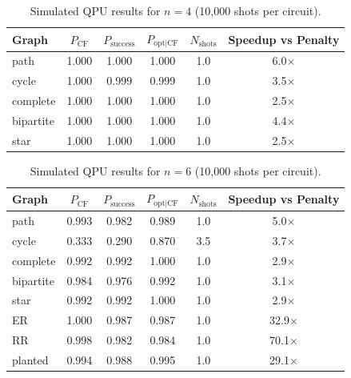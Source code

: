 \begin{table}[ht]
\centering
\caption{Simulated QPU results for $n=4$ (10,000 shots per circuit).}
\label{tab:qpu_n4}
\begin{tabular}{lccccc}
\toprule
Graph & $P_{\mathrm{CF}}$ & $P_{\mathrm{success}}$ & $P_{\mathrm{opt|CF}}$ & $N_{\mathrm{shots}}$ & Speedup vs Penalty \\
\midrule
path & 1.000 & 1.000 & 1.000 & 1.0 & 6.0$\times$ \\
cycle & 1.000 & 0.999 & 0.999 & 1.0 & 3.5$\times$ \\
complete & 1.000 & 1.000 & 1.000 & 1.0 & 2.5$\times$ \\
bipartite & 1.000 & 1.000 & 1.000 & 1.0 & 4.4$\times$ \\
star & 1.000 & 1.000 & 1.000 & 1.0 & 2.5$\times$ \\
\bottomrule
\end{tabular}
\end{table}

\begin{table}[ht]
\centering
\caption{Simulated QPU results for $n=6$ (10,000 shots per circuit).}
\label{tab:qpu_n6}
\begin{tabular}{lccccc}
\toprule
Graph & $P_{\mathrm{CF}}$ & $P_{\mathrm{success}}$ & $P_{\mathrm{opt|CF}}$ & $N_{\mathrm{shots}}$ & Speedup vs Penalty \\
\midrule
path & 0.993 & 0.982 & 0.989 & 1.0 & 5.0$\times$ \\
cycle & 0.333 & 0.290 & 0.870 & 3.5 & 3.7$\times$ \\
complete & 0.992 & 0.992 & 1.000 & 1.0 & 2.9$\times$ \\
bipartite & 0.984 & 0.976 & 0.992 & 1.0 & 3.1$\times$ \\
star & 0.992 & 0.992 & 1.000 & 1.0 & 2.9$\times$ \\
ER & 1.000 & 0.987 & 0.987 & 1.0 & 32.9$\times$ \\
RR & 0.998 & 0.982 & 0.984 & 1.0 & 70.1$\times$ \\
planted & 0.994 & 0.988 & 0.995 & 1.0 & 29.1$\times$ \\
\bottomrule
\end{tabular}
\end{table}


